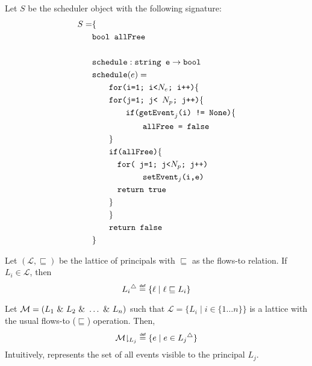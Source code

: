 \documentclass[acmsmall,screen,review, nonacm]{acmart}
\begin{document}
\begin{example}[Scheduling]\label{ex:schedule}
  Let $S$ be the  scheduler object with the following signature:
  \begin{align*}
    S = &\{ \\
    & \texttt{bool} \texttt{ allFree} \\
    \\
    & \texttt{schedule}: \texttt{string e} \to  \texttt{bool}\\
    & \texttt{schedule} (e) =  \\
    &  ~~~~~~\texttt{for(i=1; i<$N_e$; i++)} \{ \\
    &  \quad \quad \texttt{for(j=1; j< $N_p$; j++)} \{ \\
    & \qquad \qquad \texttt{if(getEvent}_j\texttt{(i) != None)} \{ \\
    & \qquad \qquad \qquad \texttt{allFree = false} \\
    & \quad \quad \} \\
    & \quad \quad \texttt{if(allFree)} \{ \\
    & \quad \quad \quad \texttt{for( j=1; j<$N_p$; j++)} \\
    & \qquad \quad \quad \qquad \texttt{setEvent}_j\texttt{(i,e)} \\
    & \quad \quad \quad \texttt{return true} \\
    & \quad \quad  \} \\
    & ~~~~~~ \} \\
    & ~~~~~~\texttt{return false} \\
    & \}
   \end{align*}
\end{example}

\begin{definition}
  Let $(\mathcal{L}, \sqsubseteq)$ be the lattice of principals with $\sqsubseteq$ as the flows-to relation. If $L_i \in \mathcal{L}$, then
  \[
      \upperbound{L_i} \isdef \{ \ell \mid \ell \sqsubseteq L_i \}
  \]
\end{definition}

\begin{definition}[Projection]
 Let $\mathcal{M} = (L_1 ~\&~ L_2 ~\&~ \dots ~\&~ L_n)$ such that $\mathcal{L} = \{L_i \mid i \in \{ 1 \dots n \} \}$ is a lattice with the usual flows-to ($\sqsubseteq$) operation. Then,
\[
     \proj{\classpart}{L_j} \isdef \{ e \mid e \in \upperbound{L_j} \}
\]
Intuitively,  represents the set of all events visible to the principal $L_j$.
\end{definition}
\end{document}
